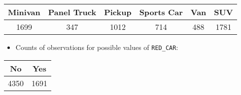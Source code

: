 \documentclass[]{article}
\providecommand{\tightlist}{%
  \setlength{\itemsep}{0pt}\setlength{\parskip}{0pt}}
\begin{document}
\begin{longtable}[]{@{}cccccc@{}}
\toprule
\begin{minipage}[b]{0.12\columnwidth}\centering\strut
Minivan\strut
\end{minipage} & \begin{minipage}[b]{0.16\columnwidth}\centering\strut
Panel Truck\strut
\end{minipage} & \begin{minipage}[b]{0.10\columnwidth}\centering\strut
Pickup\strut
\end{minipage} & \begin{minipage}[b]{0.15\columnwidth}\centering\strut
Sports Car\strut
\end{minipage} & \begin{minipage}[b]{0.07\columnwidth}\centering\strut
Van\strut
\end{minipage} & \begin{minipage}[b]{0.07\columnwidth}\centering\strut
SUV\strut
\end{minipage}\tabularnewline
\midrule
\endhead
\begin{minipage}[t]{0.12\columnwidth}\centering\strut
1699\strut
\end{minipage} & \begin{minipage}[t]{0.16\columnwidth}\centering\strut
347\strut
\end{minipage} & \begin{minipage}[t]{0.10\columnwidth}\centering\strut
1012\strut
\end{minipage} & \begin{minipage}[t]{0.15\columnwidth}\centering\strut
714\strut
\end{minipage} & \begin{minipage}[t]{0.07\columnwidth}\centering\strut
488\strut
\end{minipage} & \begin{minipage}[t]{0.07\columnwidth}\centering\strut
1781\strut
\end{minipage}\tabularnewline
\bottomrule
\end{longtable}

\begin{itemize}
\tightlist
\item
  Counts of observations for possible values of \texttt{RED\_CAR}:
\end{itemize}

\begin{longtable}[]{@{}cc@{}}
\toprule
\begin{minipage}[b]{0.09\columnwidth}\centering\strut
No\strut
\end{minipage} & \begin{minipage}[b]{0.09\columnwidth}\centering\strut
Yes\strut
\end{minipage}\tabularnewline
\midrule
\endhead
\begin{minipage}[t]{0.09\columnwidth}\centering\strut
4350\strut
\end{minipage} & \begin{minipage}[t]{0.09\columnwidth}\centering\strut
1691\strut
\end{minipage}\tabularnewline
\bottomrule
\end{longtable}
\end{document}

